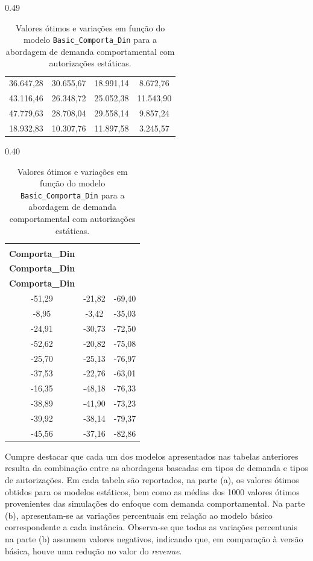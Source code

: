 \begin{table}[H]
\begin{subtable}[t]{0.49\textwidth}
\begin{tabular}{@{}cccc@{}}
			36.647,28  & 30.655,67  & 18.991,14  & 8.672,76   \\
			43.116,46  & 26.348,72  & 25.052,38  & 11.543,90  \\
			47.779,63  & 28.708,04  & 29.558,14  & 9.857,24   \\
			18.932,83  & 10.307,76  & 11.897,58  & 3.245,57   \\
			\bottomrule
		\end{tabular}
		\caption{Z* (\$)}
	\end{subtable}
	\hfill
	\begin{subtable}[t]{0.40\textwidth}
		\centering
		\begin{tabular}{@{}ccc@{}}
			\toprule
			\makecell[c]{\textbf{Fulfill\_}                  \\\textbf{Comporta\_Din}}
			       & \makecell[c]{\textbf{Skipla\_}          \\\textbf{Comporta\_Din}}
			       & \makecell[c]{\textbf{Comp\_}            \\\textbf{Comporta\_Din}} \\
			\midrule
			-51,29 & -21,82 & -69,40 \\
			-8,95  & -3,42  & -35,03 \\
			-24,91 & -30,73 & -72,50 \\
			-52,62 & -20,82 & -75,08 \\
			-25,70 & -25,13 & -76,97 \\
			-37,53 & -22,76 & -63,01 \\
			-16,35 & -48,18 & -76,33 \\
			-38,89 & -41,90 & -73,23 \\
			-39,92 & -38,14 & -79,37 \\
			-45,56 & -37,16 & -82,86 \\
			\bottomrule
		\end{tabular}
		\caption{Variação das diferenças no Z* (\%)}
	\end{subtable}

	\caption{Valores ótimos e variações em função do modelo \texttt{Basic\_Comporta\_Din} para a abordagem de demanda comportamental com autorizações estáticas.}
	\label{tab: tab_Basic_Comporta_Din}
\end{table}

Cumpre destacar que cada um dos modelos apresentados nas tabelas anteriores resulta da combinação entre as abordagens baseadas em tipos de demanda e tipos de autorizações. Em cada tabela são reportados, na parte (a), os valores ótimos obtidos para os modelos estáticos, bem como as médias dos 1000 valores ótimos provenientes das simulações do enfoque com demanda comportamental. Na parte (b), apresentam-se as variações percentuais em relação ao modelo básico correspondente a cada instância. Observa-se que todas as variações percentuais na parte (b) assumem valores negativos, indicando que, em comparação à versão básica, houve uma redução no valor do \textit{revenue}.

